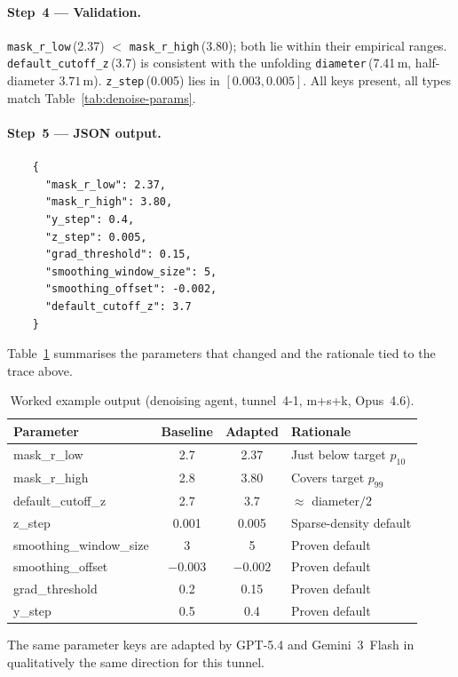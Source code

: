 \paragraph{Step~4 --- Validation.}
\texttt{mask\_r\_low}\,(2.37) $<$ \texttt{mask\_r\_high}\,(3.80); both lie within their empirical ranges. \texttt{default\_cutoff\_z}\,(3.7) is consistent with the unfolding \texttt{diameter}\,(7.41\,m, half-diameter $3.71$\,m). \texttt{z\_step}\,(0.005) lies in $[0.003, 0.005]$. All keys present, all types match Table~\ref{tab:denoise-params}.

\paragraph{Step~5 --- JSON output.}
\begin{verbatim}
    {
      "mask_r_low": 2.37,
      "mask_r_high": 3.80,
      "y_step": 0.4,
      "z_step": 0.005,
      "grad_threshold": 0.15,
      "smoothing_window_size": 5,
      "smoothing_offset": -0.002,
      "default_cutoff_z": 3.7
    }
\end{verbatim}

Table~\ref{tab:cot-example} summarises the parameters that changed and the rationale tied to the trace above.

\begin{table}[ht]
\caption{Worked example output (denoising agent, tunnel~4-1, m+s+k, Opus~4.6).}\label{tab:cot-example}
\begin{tabular*}{\tblwidth}{@{} l c c l @{}}
\toprule
Parameter & Baseline & Adapted & Rationale \\
\midrule
mask\_r\_low & 2.7 & 2.37 & Just below target $p_{10}$ \\
mask\_r\_high & 2.8 & 3.80 & Covers target $p_{99}$ \\
default\_cutoff\_z & 2.7 & 3.7 & $\approx$ diameter$/2$ \\
z\_step & 0.001 & 0.005 & Sparse-density default \\
smoothing\_window\_size & 3 & 5 & Proven default \\
smoothing\_offset & $-0.003$ & $-0.002$ & Proven default \\
grad\_threshold & 0.2 & 0.15 & Proven default \\
y\_step & 0.5 & 0.4 & Proven default \\
\bottomrule
\end{tabular*}
\end{table}

The same parameter keys are adapted by GPT-5.4 and Gemini~3~Flash in qualitatively the same direction for this tunnel.

